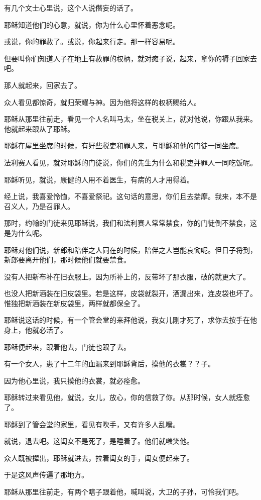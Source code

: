 \documentclass[12pt,oneside]{book}
\begin{document}
有几个文士心里说，这个人说僭妄的话了。

耶稣知道他们的心意，就说，你为什么心里怀着恶念呢。

或说，你的罪赦了。或说，你起来行走。那一样容易呢。

但要叫你们知道人子在地上有赦罪的权柄，就对瘫子说，起来，拿你的褥子回家去吧。

那人就起来，回家去了。

众人看见都惊奇，就归荣耀与神。因为他将这样的权柄赐给人。

耶稣从那里往前走，看见一个人名叫马太，坐在税关上，就对他说，你跟从我来。他就起来跟从了耶稣。

耶稣在屋里坐席的时候，有好些税吏和罪人来，与耶稣和他的门徒一同坐席。

法利赛人看见，就对耶稣的门徒说，你们的先生为什么和税吏并罪人一同吃饭呢。

耶稣听见，就说，康健的人用不着医生，有病的人才用得着。

经上说，我喜爱怜恤，不喜爱祭祀。这句话的意思，你们且去揣摩。我来，本不是召义人，乃是召罪人。

那时，约翰的门徒来见耶稣说，我们和法利赛人常常禁食，你的门徒倒不禁食，这是为什么呢。

耶稣对他们说，新郎和陪伴之人同在的时候，陪伴之人岂能哀恸呢。但日子将到，新郎要离开他们，那时候他们就要禁食。

没有人把新布补在旧衣服上。因为所补上的，反带坏了那衣服，破的就更大了。

也没人把新酒装在旧皮袋里。若是这样，皮袋就裂开，酒漏出来，连皮袋也坏了。惟独把新酒装在新皮袋里，两样就都保全了。

耶稣说这话的时候，有一个管会堂的来拜他说，我女儿刚才死了，求你去按手在他身上，他就必活了。

耶稣便起来，跟着他去，门徒也跟了去。

有一个女人，患了十二年的血漏来到耶稣背后，摸他的衣裳？？子。

因为他心里说，我只摸他的衣裳，就必痊愈。

耶稣转过来看见他，就说，女儿，放心，你的信救了你。从那时候，女人就痊愈了。

耶稣到了管会堂的家里，看见有吹手，又有许多人乱囔。

就说，退去吧。这闺女不是死了，是睡着了。他们就嗤笑他。

众人既被撵出，耶稣就进去，拉着闺女的手，闺女便起来了。

于是这风声传遍了那地方。

耶稣从那里往前走，有两个瞎子跟着他，喊叫说，大卫的子孙，可怜我们吧。
\end{document}
